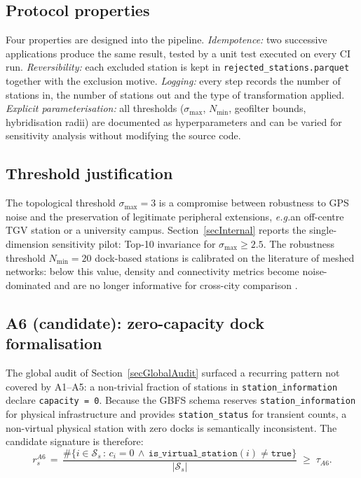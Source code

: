 \documentclass[11pt,a4paper]{article}
\newcommand{\eg}{\emph{e.g.}}
\begin{document}
\subsection{Protocol properties}
Four properties are designed into the pipeline. \emph{Idempotence:} two
successive applications produce the same result, tested by a unit test
executed on every CI run. \emph{Reversibility:} each excluded station
is kept in \texttt{rejected\_stations.parquet} together with the
exclusion motive. \emph{Logging:} every step records the number of
stations in, the number of stations out and the type of transformation
applied. \emph{Explicit parameterisation:} all thresholds
($\sigma_{\max}$, $N_{\min}$, geofilter bounds, hybridisation radii)
are documented as hyperparameters and can be varied for sensitivity
analysis without modifying the source code.

\subsection{Threshold justification}
The topological threshold $\sigma_{\max} = 3$ is a compromise between
robustness to GPS noise and the preservation of legitimate peripheral
extensions, \eg an off-centre TGV station or a university campus.
Section~\ref{secInternal} reports the single-dimension sensitivity
pilot: Top-10 invariance for $\sigma_{\max} \ge 2.5$. The robustness
threshold $N_{\min} = 20$ dock-based stations is calibrated on the
literature of meshed networks: below this value, density and
connectivity metrics become noise-dominated and are no longer
informative for cross-city comparison \cite{Saberi2018}.

\subsection{A6 (candidate): zero-capacity dock formalisation}\label{secA6Formalisation}
The global audit of Section~\ref{secGlobalAudit} surfaced a recurring
pattern not covered by A1--A5: a non-trivial fraction of stations in
\texttt{station\_information} declare \texttt{capacity = 0}. Because
the GBFS schema reserves \texttt{station\_information} for physical
infrastructure and provides \texttt{station\_status} for transient
counts, a non-virtual physical station with zero docks is
semantically inconsistent. The candidate signature is therefore:
\begin{equation}
r_s^{A6} \,=\,
\frac{\#\{i \in \mathcal{S}_s \,:\, c_i = 0 \,\land\, \mathtt{is\_virtual\_station}(i) \neq \mathtt{true}\}}{|\mathcal{S}_s|}
\;\geq\; \tau_{A6}.
\end{equation}
\end{document}
